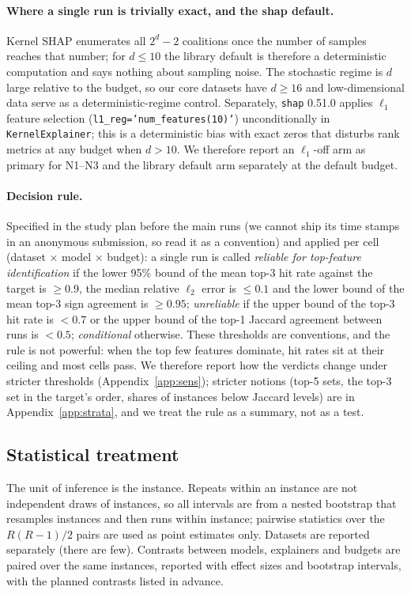 \paragraph{Where a single run is trivially exact, and the shap default.}
Kernel SHAP enumerates all $2^d-2$ coalitions once the number of samples reaches that number; for $d\le 10$ the library default is therefore a deterministic computation and says nothing about sampling noise. The stochastic regime is $d$ large relative to the budget, so our core datasets have $d\ge16$ and low-dimensional data serve as a deterministic-regime control. Separately, \texttt{shap} 0.51.0 applies $\ell_1$ feature selection (\texttt{l1\_reg='num\_features(10)'}) unconditionally in \texttt{KernelExplainer}; this is a deterministic bias with exact zeros that disturbs rank metrics at any budget when $d>10$. We therefore report an $\ell_1$-off arm as primary for N1--N3 and the library default arm separately at the default budget.

\paragraph{Decision rule.}
Specified in the study plan before the main runs (we cannot ship its time stamps in an anonymous submission, so read it as a convention) and applied per cell (dataset $\times$ model $\times$ budget): a single run is called \emph{reliable for top-feature identification} if the lower 95\% bound of the mean top-3 hit rate against the target is $\ge0.9$, the median relative $\ell_2$ error is $\le0.1$ and the lower bound of the mean top-3 sign agreement is $\ge0.95$; \emph{unreliable} if the upper bound of the top-3 hit rate is $<0.7$ or the upper bound of the top-1 Jaccard agreement between runs is $<0.5$; \emph{conditional} otherwise. These thresholds are conventions, and the rule is not powerful: when the top few features dominate, hit rates sit at their ceiling and most cells pass. We therefore report how the verdicts change under stricter thresholds (Appendix~\ref{app:sens}); stricter notions (top-5 sets, the top-3 set in the target's order, shares of instances below Jaccard levels) are in Appendix~\ref{app:strata}, and we treat the rule as a summary, not as a test.

\subsection{Statistical treatment}
The unit of inference is the instance. Repeats within an instance are not independent draws of instances, so all intervals are from a nested bootstrap that resamples instances and then runs within instance; pairwise statistics over the $R(R-1)/2$ pairs are used as point estimates only. Datasets are reported separately (there are few). Contrasts between models, explainers and budgets are paired over the same instances, reported with effect sizes and bootstrap intervals, with the planned contrasts listed in advance.

